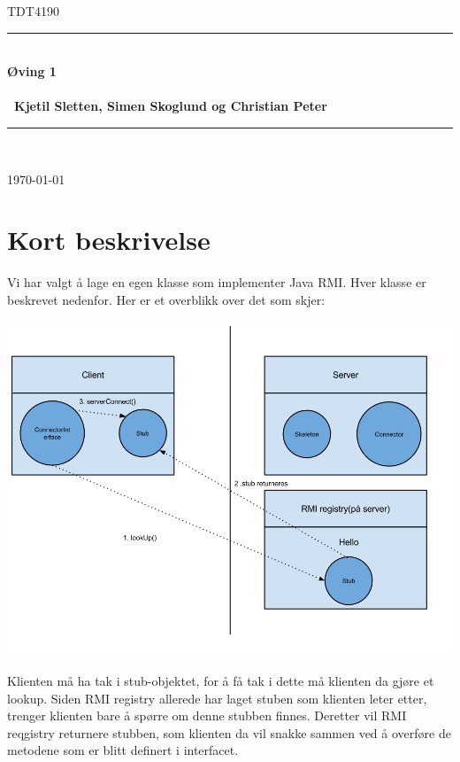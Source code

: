 \documentclass[11pt, a4paper]{article}	%
\begin{document}
\begin{titlepage}
\newcommand{\HRule}{\rule{\linewidth}{0.5mm}}
 
\begin{center}
 

\textsc{\huge TDT4190 }\\[2.0cm]

 
\HRule \\[0.3cm]
{\huge \bfseries  Øving  1
\\\ \\\ \LARGE Kjetil Sletten, Simen Skoglund og Christian Peter }\\[0.4cm]
\HRule \\[1.5cm]
 
\vfill
 
{\large \today}
 
\end{center}
\end{titlepage}

\section{Kort beskrivelse}
Vi har valgt å lage en egen klasse som implementer Java RMI. Hver klasse er beskrevet nedenfor. Her er et overblikk over det som skjer:
\begin{center}
\includegraphics[scale=0.5]{TicTacToe}
\end{center}

Klienten må ha tak i stub-objektet, for å få tak i dette må klienten da gjøre et lookup. Siden RMI registry allerede har laget stuben som klienten leter etter, trenger klienten bare å spørre om denne stubben finnes. Deretter vil RMI reqgistry returnere stubben, som klienten da vil snakke sammen ved å overføre de metodene som er blitt definert i interfacet. 
\end{document}
